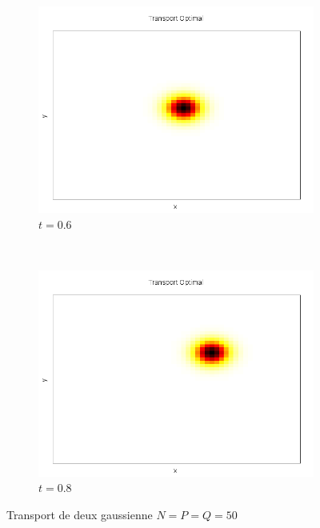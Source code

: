 \documentclass{beamer}
\begin{document}
\begin{frame}
\begin{figure}[!h]
\begin{subfigure}[b]{0.22\linewidth}
	\includegraphics[width=\textwidth]{img/2DGaussian/C_00030.png}
	\caption{$t=0.6$}
	\end{subfigure}
	~
	\begin{subfigure}[b]{0.22\linewidth}
	\includegraphics[width=\textwidth]{img/2DGaussian/C_00040.png}
	\caption{$t=0.8$}
	\end{subfigure}
	\caption{Transport de deux gaussienne $N=P=Q=50$}
\end{figure}
\end{frame}
\end{document}
